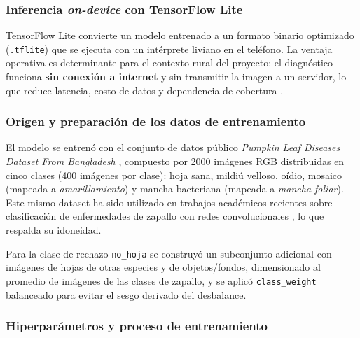 \documentclass[12pt,a4paper]{article}
\begin{document}
\subsubsection{Inferencia \textit{on-device} con TensorFlow Lite}

TensorFlow Lite convierte un modelo entrenado a un formato binario optimizado
(\texttt{.tflite}) que se ejecuta con un intérprete liviano en el teléfono. La
ventaja operativa es determinante para el contexto rural del proyecto: el
diagnóstico funciona \textbf{sin conexión a internet} y sin transmitir la
imagen a un servidor, lo que reduce latencia, costo de datos y dependencia de
cobertura \cite{maizemobile2023}.

\subsubsection{Origen y preparación de los datos de entrenamiento}

El modelo se entrenó con el conjunto de datos público \textit{Pumpkin Leaf
Diseases Dataset From Bangladesh} \cite{kaggledataset}, compuesto por 2000
imágenes RGB distribuidas en cinco clases (400 imágenes por clase): hoja sana,
mildiú velloso, oídio, mosaico (mapeada a \textit{amarillamiento}) y mancha
bacteriana (mapeada a \textit{mancha foliar}). Este mismo dataset ha sido
utilizado en trabajos académicos recientes sobre clasificación de enfermedades
de zapallo con redes convolucionales \cite{pumpkin2024, pumpkinxai2025}, lo que
respalda su idoneidad.

Para la clase de rechazo \texttt{no\_hoja} se construyó un subconjunto adicional
con imágenes de hojas de otras especies y de objetos/fondos, dimensionado al
promedio de imágenes de las clases de zapallo, y se aplicó
\texttt{class\_weight} balanceado para evitar el sesgo derivado del
desbalance.

\subsubsection{Hiperparámetros y proceso de entrenamiento}
\end{document}
